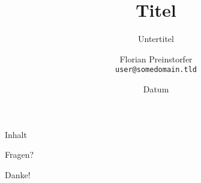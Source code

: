 \documentclass[%
]{beamer}
\title{Titel}
\subtitle{Untertitel}
\author[Florian Preinstorfer]{Florian Preinstorfer\\
  \small{\texttt{user@somedomain.tld}}
}
\date[Ort - Datum]{Datum}
\begin{document}
\frame[plain]{\titlepage}

\begin{frame}{Inhalt}
  \tableofcontents[pausesections]
\end{frame}


\begin{frame}[plain]
  \begin{center}
  Fragen?

  Danke!
  \end{center}
\end{frame}
\end{document}
